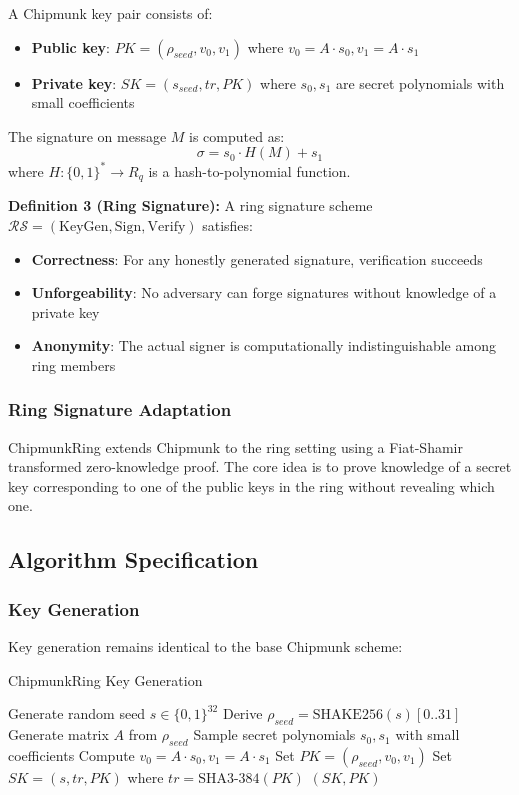 \documentclass[11pt,a4paper]{article}
\begin{document}
A Chipmunk key pair consists of:
\begin{itemize}
\item \textbf{Public key}: $PK = (\rho_{seed}, v_0, v_1)$ where $v_0 = A \cdot s_0, v_1 = A \cdot s_1$
\item \textbf{Private key}: $SK = (s_{seed}, tr, PK)$ where $s_0, s_1$ are secret polynomials with small coefficients
\end{itemize}

The signature on message $M$ is computed as:
\begin{equation}
\sigma = s_0 \cdot H(M) + s_1
\end{equation}
where $H: \{0,1\}^* \rightarrow R_q$ is a hash-to-polynomial function.

\textbf{Definition 3 (Ring Signature):} A ring signature scheme $\mathcal{RS} = (\text{KeyGen}, \text{Sign}, \text{Verify})$ satisfies:
\begin{itemize}
\item \textbf{Correctness}: For any honestly generated signature, verification succeeds
\item \textbf{Unforgeability}: No adversary can forge signatures without knowledge of a private key
\item \textbf{Anonymity}: The actual signer is computationally indistinguishable among ring members
\end{itemize}

\subsubsection{Ring Signature Adaptation}

ChipmunkRing extends Chipmunk to the ring setting using a Fiat-Shamir transformed zero-knowledge proof. The core idea is to prove knowledge of a secret key corresponding to one of the public keys in the ring without revealing which one.

\subsection{Algorithm Specification}

\subsubsection{Key Generation}
Key generation remains identical to the base Chipmunk scheme:
\begin{algorithm}
\caption{ChipmunkRing Key Generation}
\begin{algorithmic}[1]
\STATE Generate random seed $s \in \{0,1\}^{32}$
\STATE Derive $\rho_{seed} = \text{SHAKE256}(s)[0..31]$
\STATE Generate matrix $A$ from $\rho_{seed}$
\STATE Sample secret polynomials $s_0, s_1$ with small coefficients
\STATE Compute $v_0 = A \cdot s_0, v_1 = A \cdot s_1$
\STATE Set $PK = (\rho_{seed}, v_0, v_1)$
\STATE Set $SK = (s, tr, PK)$ where $tr = \text{SHA3-384}(PK)$
\RETURN $(SK, PK)$
\end{algorithmic}
\end{algorithm}
\end{document}
